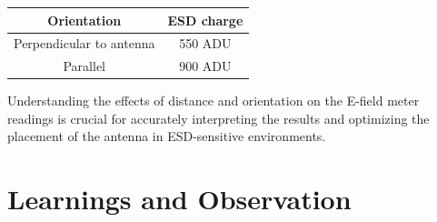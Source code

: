 \documentclass[a4paper,11pt]{article}%
\begin{document}
\begin{itemize}
        \begin{table}[H]
          \centering
          \begin{tabular}{|c|c|}
            \hline
            Orientation              & ESD charge \\
            \hline
            Perpendicular to antenna & 550 ADU    \\
            Parallel                 & 900 ADU    \\

            \hline
          \end{tabular}
        \end{table}


\end{itemize}
Understanding the effects of distance and orientation on the E-field meter readings is crucial for accurately interpreting the results and optimizing the placement of the antenna in ESD-sensitive environments.


\section{Learnings and Observation}
\end{document}
